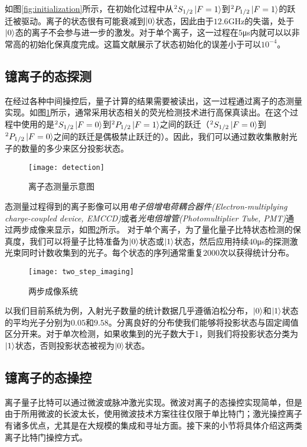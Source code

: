 如图\ref{fig:initialization}所示，在初始化过程中从$^2S_{1/2}\ket{F=1}$到$^2P_{1/2}\ket{F=1}$的跃迁被驱动。离子的状态很有可能衰减到$\ket{0}$状态，因此由于$12.6$GHz的失谐，处于$\ket{0}$态的离子不会参与进一步的激发。对于单个离子，这一过程在$5$μs内就可以以非常高的初始化保真度完成。这篇\cite[]{Harty_Allcock_Ballance_Guidoni_Janacek_Linke_Stacey_Lucas_2014}文献展示了状态初始化的误差小于可以$10^{−4}$。

\subsection[镱离子的态探测]{镱离子的态探测\label{section:yb_state_detection}}
在经过各种中间操控后，量子计算的结果需要被读出，这一过程通过离子的态测量实现。如图\ref{fig:detection}所示，通常采用状态相关的荧光检测技术进行高保真读出\cite[]{Blinov_Leibfried_Monroe_Wineland_2004}。在这个过程中使用的是$^2S_{1/2}\ket{F=0}$到$^2P_{1/2}\ket{F=1}$之间的跃迁（$^2S_{1/2}\ket{F=0}$到$^2P_{1/2}\ket{F=0}$之间的跃迁是偶极禁止跃迁的）。因此，我们可以通过数收集散射光子的数量的多少来区分投影状态。
\begin{figure}
    \centering
    \caption[离子态测量示意图]{离子态测量示意图\label{fig:detection}}
    \texttt{[image: detection]}
\end{figure}

态测量过程得到的离子影像可以用\emph{电子倍增电荷耦合器件(Electron-multiplying charge-coupled device, EMCCD)}或者\emph{光电倍增管(Photomultiplier Tube, PMT)}通过两步成像来显示，如图\ref{fig:two_step_imaging}所示。
对于单个离子，为了量化量子比特状态检测的保真度，我们可以将量子比特准备为$\ket{0}$状态或$\ket{1}$状态，然后应用持续$40$μs的探测激光束同时计数收集到的光子。每个状态的序列通常重复$2000$次以获得统计分布。


\begin{figure}
    \centering
    \caption[两步成像系统]{两步成像系统\label{fig:two_step_imaging}}
    \texttt{[image: two\_step\_imaging]}
\end{figure}

以我们目前系统为例，入射光子数量的统计数据几乎遵循泊松分布，$\ket{0}$和$\ket{1}$状态的平均光子分别为$0.05$和$9.58$。分离良好的分布使我们能够将投影状态与固定阈值区分开来。对于单次检测，如果收集到的光子数大于1，则我们将投影状态分类为$\ket{1}$状态，否则投影状态被视为$\ket{0}$状态。

\subsection[镱离子的态操控]{镱离子的态操控\label{section:yb_state_manipulation}}
离子量子比特可以通过微波\cite[]{Olmschenk_Younge_Moehring_Matsukevich_Maunz_Monroe_2007}或脉冲激光\cite[]{Lee_2005}实现。微波对离子的态操控实现简单，但是由于所用微波的长波太长，使用微波技术方案往往仅限于单比特门；激光操控离子有诸多优点，尤其是在大规模的集成和寻址方面。接下来的小节将具体介绍这两类离子比特门操控方式。
